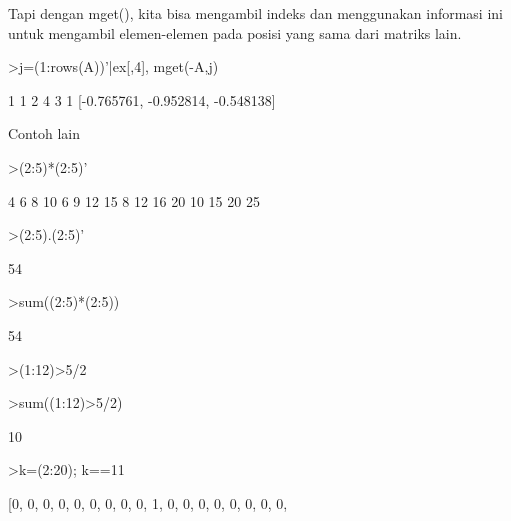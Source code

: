 \documentclass[12pt,arial,letterpaper]{book}
\begin{document}
\begin{eulercomment}
\begin{eulercomment}
\begin{eulercomment}
Tapi dengan mget(), kita bisa mengambil indeks dan menggunakan
informasi ini untuk mengambil elemen-elemen pada posisi yang sama dari
matriks lain.
\end{eulercomment}
\begin{eulerprompt}
>j=(1:rows(A))'|ex[,4], mget(-A,j)
\end{eulerprompt}
\begin{euleroutput}
              1             1 
              2             4 
              3             1 
  [-0.765761,  -0.952814,  -0.548138]
\end{euleroutput}
\begin{eulercomment}
Contoh lain
\end{eulercomment}
\begin{eulerprompt}
>(2:5)*(2:5)'
\end{eulerprompt}
\begin{euleroutput}
              4             6             8            10 
              6             9            12            15 
              8            12            16            20 
             10            15            20            25 
\end{euleroutput}
\begin{eulerprompt}
>(2:5).(2:5)'
\end{eulerprompt}
\begin{euleroutput}
  54
\end{euleroutput}
\begin{eulerprompt}
>sum((2:5)*(2:5))
\end{eulerprompt}
\begin{euleroutput}
  54
\end{euleroutput}
\begin{eulerprompt}
>(1:12)>5/2
\end{eulerprompt}
\begin{euleroutput}
  [0,  0,  1,  1,  1,  1,  1,  1,  1,  1,  1,  1]
\end{euleroutput}
\begin{eulerprompt}
>sum((1:12)>5/2)
\end{eulerprompt}
\begin{euleroutput}
  10
\end{euleroutput}
\begin{eulerprompt}
>k=(2:20); k==11
\end{eulerprompt}
\begin{euleroutput}
  [0,  0,  0,  0,  0,  0,  0,  0,  0,  1,  0,  0,  0,  0,  0,  0,  0,  0,

\end{euleroutput}
\end{eulercomment}
\end{eulercomment}
\end{document}
